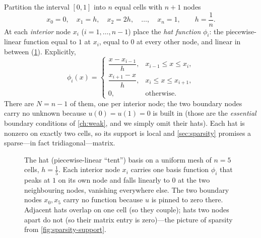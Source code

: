 Partition the interval $[0,1]$ into $n$ equal cells with $n+1$ nodes
\[
x_0=0,\quad x_1=h,\quad x_2=2h,\quad\dots,\quad x_n=1,
\qquad h=\frac1n.
\]
At each \emph{interior} node $x_i$ ($i=1,\dots,n-1$) place the \emph{hat
function} $\phi_i$: the piecewise-linear function equal to $1$ at $x_i$, equal to
$0$ at every other node, and linear in between (\cref{fig:hats}). Explicitly,
\begin{equation}
\phi_i(x)=
\begin{cases}
\dfrac{x-x_{i-1}}{h}, & x_{i-1}\le x\le x_i,\\[2ex]
\dfrac{x_{i+1}-x}{h}, & x_i\le x\le x_{i+1},\\[1ex]
0, & \text{otherwise.}
\end{cases}
\label{eq:hat}
\end{equation}
There are $N=n-1$ of them, one per interior node; the two boundary nodes carry no
unknown because $u(0)=u(1)=0$ is built in (those are the \emph{essential} boundary
conditions of \cref{ch:weak}, and we simply omit their hats). Each hat is nonzero
on exactly two cells, so its support is local and \cref{sec:sparsity} promises a
sparse---in fact tridiagonal---matrix.

\begin{figure}[t]
\centering
{}
\caption[The hat basis]{The hat (piecewise-linear ``tent'') basis on a uniform
mesh of $n=5$ cells, $h=\tfrac15$. Each interior node $x_i$ carries one basis
function $\phi_i$ that peaks at $1$ on its own node and falls linearly to $0$ at
the two neighbouring nodes, vanishing everywhere else. The two boundary nodes
$x_0,x_5$ carry no function because $u$ is pinned to zero there. Adjacent hats
overlap on one cell (so they couple); hats two nodes apart do not (so their matrix
entry is zero)---the picture of sparsity from \cref{fig:sparsity-support}.}
\label{fig:hats}
\end{figure}

